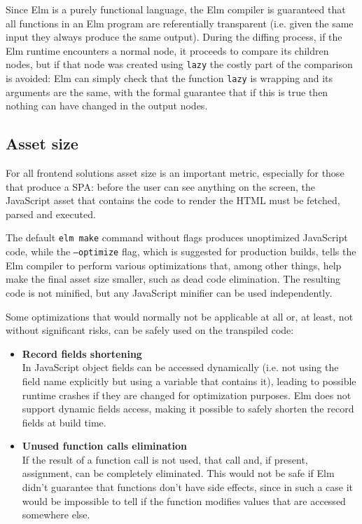 Since Elm is a purely functional language, the Elm compiler is guaranteed that all functions in an Elm program are referentially transparent (i.e. given the same input they always produce the same output). During the diffing process, if the Elm runtime encounters a normal node, it proceeds to compare its children nodes, but if that node was created using \texttt{lazy} the costly part of the comparison is avoided: Elm can simply check that the function \texttt{lazy} is wrapping and its arguments are the same, with the formal guarantee that if this is true then nothing can have changed in the output nodes.

\subsection{Asset size}
For all frontend solutions asset size is an important metric, especially for those that produce a SPA: before the user can see anything on the screen, the JavaScript asset that contains the code to render the HTML must be fetched, parsed and executed.

The default \texttt{elm make} command without flags produces unoptimized JavaScript code, while the \texttt{--optimize} flag, which is suggested for production builds, tells the Elm compiler to perform various optimizations that, among other things, help make the final asset size smaller, such as dead code elimination. The resulting code is not minified, but any JavaScript minifier can be used independently. \cite{noauthor_minification_nodate}

Some optimizations that would normally not be applicable at all or, at least, not without significant risks, can be safely used on the transpiled code:
\begin{itemize}
    \item \textbf{Record fields shortening}\\In JavaScript object fields can be accessed dynamically (i.e. not using the field name explicitly but using a variable that contains it), leading to possible runtime crashes if they are changed for optimization purposes. Elm does not support dynamic fields access, making it possible to safely shorten the record fields at build time.
    \item \textbf{Unused function calls elimination}\\If the result of a function call is not used, that call and, if present, assignment, can be completely eliminated. This would not be safe if Elm didn't guarantee that functions don't have side effects, since in such a case it would be impossible to tell if the function modifies values that are accessed somewhere else.
\end{itemize}
